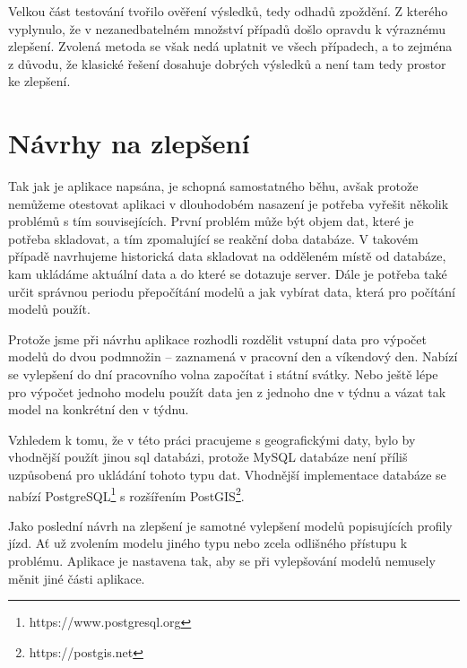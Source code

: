 Velkou část testování tvořilo ověření výsledků, tedy odhadů zpoždění. Z kterého vyplynulo, že v nezanedbatelném množství případů došlo opravdu k výraznému zlepšení. Zvolená metoda se však nedá uplatnit ve všech případech, a to zejména z důvodu, že klasické řešení dosahuje dobrých výsledků a není tam tedy prostor ke zlepšení.


\section*{Návrhy na zlepšení}


Tak jak je aplikace napsána, je schopná samostatného běhu, avšak protože nemůžeme otestovat aplikaci v dlouhodobém nasazení je potřeba vyřešit několik problémů s tím souvisejících. První problém může být objem dat, které je potřeba skladovat, a tím zpomalující se reakční doba databáze. V takovém případě navrhujeme historická data skladovat na odděleném místě od databáze, kam ukládáme aktuální data a do které se dotazuje server. Dále je potřeba také určit správnou periodu přepočítání modelů a jak vybírat data, která pro počítání modelů použít.


\bigbreak


Protože jsme při návrhu aplikace rozhodli rozdělit vstupní data pro výpočet modelů do dvou podmnožin -- zaznamená v pracovní den a víkendový den. Nabízí se vylepšení do dní pracovního volna započítat i státní svátky. Nebo ještě lépe pro výpočet jednoho modelu použít data jen z jednoho dne v týdnu a vázat tak model na konkrétní den v týdnu.
\bigbreak


Vzhledem k tomu, že v této práci pracujeme s geografickými daty, bylo by vhodnější použít jinou \gls{sql} databázi, protože MySQL databáze není příliš uzpůsobená pro ukládání tohoto typu dat. Vhodnější implementace databáze se nabízí PostgreSQL\footnote{https://www.postgresql.org} s rozšířením PostGIS\footnote{https://postgis.net}.


\bigbreak


Jako poslední návrh na zlepšení je samotné vylepšení modelů popisujících profily jízd. Ať už zvolením modelu jiného typu nebo zcela odlišného přístupu k problému. Aplikace je nastavena tak, aby se při vylepšování modelů nemusely měnit jiné části aplikace.
